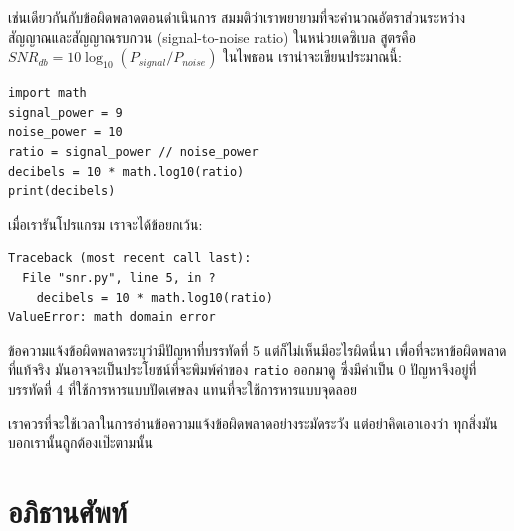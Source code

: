 เช่นเดียวกันกับข้อผิดพลาดตอนดำเนินการ สมมติว่าเราพยายามที่จะคำนวณอัตราส่วนระหว่าง
สัญญาณและสัญญาณรบกวน (signal-to-noise ratio) ในหน่วยเดซิเบล สูตรคือ $SNR_{db} = 10 \log_{10} (P_{signal} / P_{noise})$
ในไพธอน เราน่าจะเขียนประมาณนี้:

\begin{verbatim}
import math
signal_power = 9
noise_power = 10
ratio = signal_power // noise_power
decibels = 10 * math.log10(ratio)
print(decibels)
\end{verbatim}
%
เมื่อเรารันโปรแกรม เราจะได้ข้อยกเว้น:
%

\begin{verbatim}
Traceback (most recent call last):
  File "snr.py", line 5, in ?
    decibels = 10 * math.log10(ratio)
ValueError: math domain error
\end{verbatim}
%
ข้อความแจ้งข้อผิดพลาดระบุว่ามีปัญหาที่บรรทัดที่ 5 แต่ก็ไม่เห็นมีอะไรผิดนี่นา 
เพื่อที่จะหาข้อผิดพลาดที่แท้จริง มันอาจจะเป็นประโยชน์ที่จะพิมพ์ค่าของ {\tt ratio} ออกมาดู 
ซึ่งมีค่าเป็น 0 ปัญหาจึงอยู่ที่บรรทัดที่ 4 ที่ใช้การหารแบบปัดเศษลง แทนที่จะใช้การหารแบบจุดลอย

เราควรที่จะใช้เวลาในการอ่านข้อความแจ้งข้อผิดพลาดอย่างระมัดระวัง
แต่อย่าคิดเอาเองว่า ทุกสิ่งมันบอกเรานั้นถูกต้องเป๊ะตามนั้น


\section{อภิธานศัพท์}

